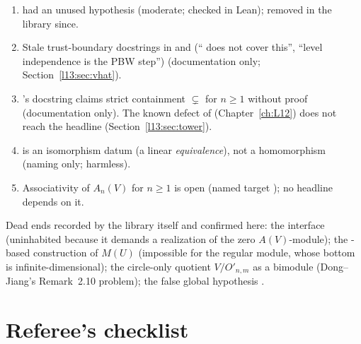 \begin{enumerate}
  proved by the library; docstrings stale, documentation only).
\item {} had an unused hypothesis  (moderate; checked in Lean); removed in the library since.
\item Stale trust-boundary docstrings in  and  (``
  does not cover this'', ``level independence is the PBW step'') (documentation only; Section~\ref{l13:sec:vhat}).
\item {}'s docstring claims strict containment  $\subsetneq$  for $n\ge1$ without proof (documentation only).
  The known defect of  (Chapter~\ref{ch:L12}) does not reach the headline (Section~\ref{l13:sec:tower}).
\item {} is an isomorphism datum (a linear \emph{equivalence}), not a homomorphism (naming only; harmless).
\item Associativity of $A_n(V)$ for $n\ge1$ is open (named target ); no headline depends on it.
\end{enumerate}
Dead ends recorded by the library itself and confirmed here: the  interface (uninhabited because it demands a
realization of the zero $A(V)$-module); the -based construction of $M(U)$ (impossible for the regular module, whose
bottom is infinite-dimensional); the circle-only quotient $V/O'_{n,m}$ as a bimodule (Dong--Jiang's Remark~2.10 problem); the false
global hypothesis .

\section{Referee's checklist}\label{l13:sec:checklist}

